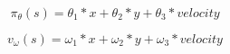 \documentclass{article}
\begin{document}
$$\pi_{\theta}(s) = \theta_{1}*x + \theta_{2}*y + \theta_{3}*velocity$$

$$v_{\omega}(s) = \omega_{1}*x + \omega_{2}*y + \omega_{3}*velocity$$
\end{document}

